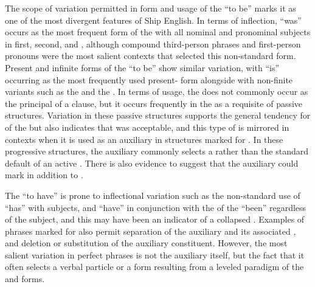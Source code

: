 The scope of variation permitted in form and usage of the  “to be” marks it as one of the most divergent features of Ship English. In terms of inflection, “was” occurs as the most frequent  form of the  with all nominal and pronominal subjects in first, second, and , although compound third-person  phrases and  first-person pronouns were the most salient contexts that selected this non-standard  form. Present  and infinite forms of the  “to be” show similar variation, with “is” occurring as the most frequently used present- form alongside  with non-finite variants such as the   and the . In terms of usage, the  does not commonly occur as the principal  of a clause, but it occurs frequently in the  as a requisite of passive structures. Variation in these passive structures supports the general tendency for  of the  but also indicates that  was acceptable, and this type of  is mirrored in contexts when it is used as an auxiliary in structures marked for .  In these progressive structures, the  auxiliary commonly selects a   rather than the standard default of an active . There is also evidence to suggest that the auxiliary  could mark  in addition to . 

The  “to have” is prone to inflectional variation such as the non-standard use of “has” with   subjects, and  “have” in conjunction with the  of the  “been” regardless of the subject, and this may have been an indicator of a collapsed . Examples of  phrases marked for  also permit separation of the auxiliary and its associated , and deletion or substitution of the auxiliary constituent. However, the most salient variation in perfect  phrases is not the auxiliary itself, but the fact that it often selects a  verbal particle or a form resulting from a leveled paradigm of the  and  forms. 

